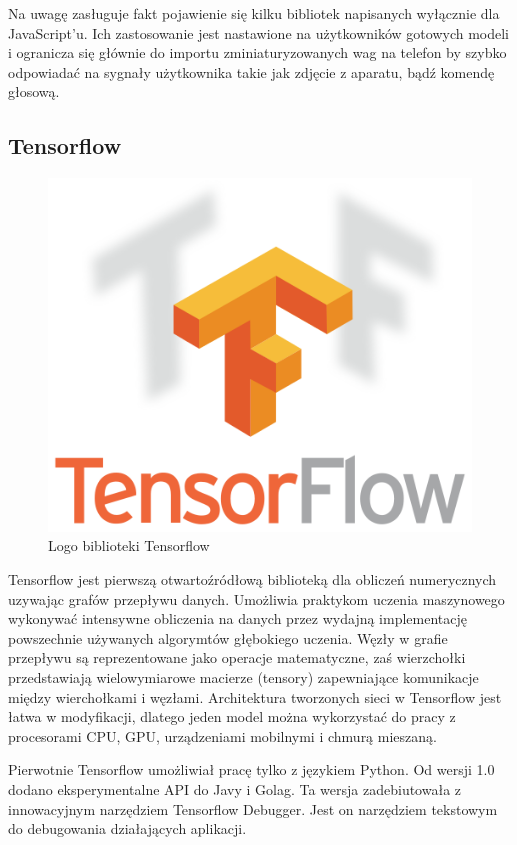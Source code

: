 \documentclass[12pt,a4paper,twoside,titlepage,openright]{book}
\begin{document}
Na uwagę zasługuje fakt pojawienie się kilku bibliotek napisanych wyłącznie dla JavaScript'u. Ich zastosowanie jest nastawione na użytkowników gotowych modeli i ogranicza się głównie do importu zminiaturyzowanych wag na telefon by szybko odpowiadać na sygnały użytkownika takie jak zdjęcie z aparatu, bądź komendę głosową. 

\subsection{Tensorflow}
\begin{figure}[h]
	\centering
			\includegraphics[resolution=100, scale=0.5]{Tensorflow.png}
		\caption{Logo biblioteki Tensorflow}
\end{figure}

Tensorflow jest pierwszą otwartoźródłową biblioteką dla obliczeń numerycznych uzywając grafów przepływu danych. Umożliwia praktykom uczenia maszynowego wykonywać intensywne obliczenia na danych przez wydajną implementację powszechnie używanych algorymtów głębokiego uczenia. Węzły w grafie przepływu są reprezentowane jako operacje matematyczne, zaś wierzchołki przedstawiają wielowymiarowe macierze (tensory) zapewniające komunikacje między wierchołkami i węzłami. Architektura tworzonych sieci w Tensorflow jest łatwa w modyfikacji, dlatego jeden model można wykorzystać do pracy z procesorami CPU, GPU, urządzeniami mobilnymi i chmurą mieszaną. \cite{DeepLearningTensorflow}

Pierwotnie Tensorflow umożliwiał pracę tylko z językiem Python. Od wersji 1.0 dodano eksperymentalne API do Javy i Golag. Ta wersja zadebiutowała z innowacyjnym narzędziem Tensorflow Debugger. Jest on narzędziem tekstowym do debugowania działających aplikacji.
\end{document}
